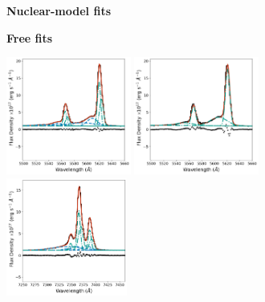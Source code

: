 \begin{figure}\ContinuedFloat
    \centering
    \begin{subfigure}[t]{0.9\linewidth}
        \begin{minipage}{0.48\linewidth}
            \centering
            \textbf{Nuclear-model fits}
        \end{minipage}
        \hfill
        \begin{minipage}{0.42\linewidth}
            \centering
            \textbf{Free fits}
        \end{minipage}
        \vfill
        \includegraphics[width=0.45\textwidth]{figures/muse_f13451_1232/line_fits/ap2_oiii.png}
        \hfill
        \includegraphics[width=0.45\textwidth]{figures/muse_f13451_1232/line_fits/ap2_oiii_no_nuclear_model.png}
        \vfill
        \includegraphics[width=0.435\textwidth]{figures/muse_f13451_1232/line_fits/ap2_halpha.png}

\end{subfigure}
\end{figure}
